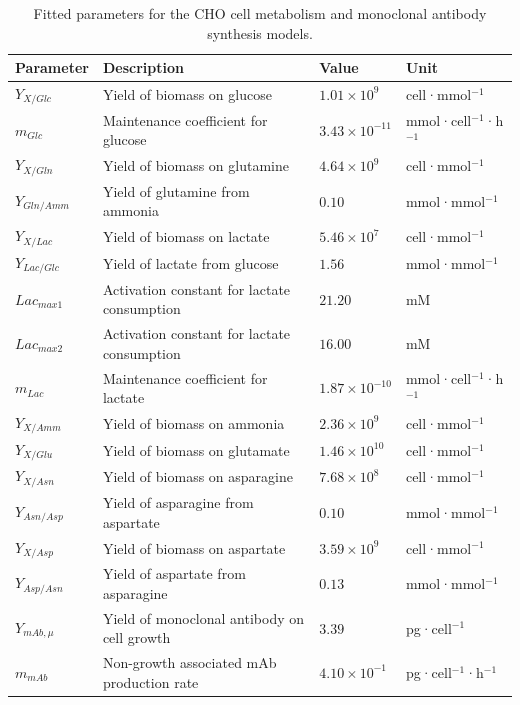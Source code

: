 \begin{table}[h!]
\centering
\caption{Fitted parameters for the CHO cell metabolism and monoclonal antibody synthesis models.}
\renewcommand{\arraystretch}{1.3}
\setlength{\tabcolsep}{8pt}
\begin{tabular}{llll}
\hline
\textbf{Parameter} & \textbf{Description} & \textbf{Value} & \textbf{Unit} \\
\hline
$Y_{X/Glc}$ & Yield of biomass on glucose & $1.01\times10^{9}$ & cell·mmol$^{-1}$ \\
$m_{Glc}$ & Maintenance coefficient for glucose & $3.43\times10^{-11}$ & mmol·cell$^{-1}$·h$^{-1}$ \\
$Y_{X/Gln}$ & Yield of biomass on glutamine & $4.64\times10^{9}$ & cell·mmol$^{-1}$ \\
$Y_{Gln/Amm}$ & Yield of glutamine from ammonia & $0.10$ & mmol·mmol$^{-1}$ \\
$Y_{X/Lac}$ & Yield of biomass on lactate & $5.46\times10^{7}$ & cell·mmol$^{-1}$ \\
$Y_{Lac/Glc}$ & Yield of lactate from glucose & $1.56$ & mmol·mmol$^{-1}$ \\
$Lac_{max1}$ & Activation constant for lactate consumption & $21.20$ & mM \\
$Lac_{max2}$ & Activation constant for lactate consumption & $16.00$ & mM \\
$m_{Lac}$ & Maintenance coefficient for lactate & $1.87\times10^{-10}$ & mmol·cell$^{-1}$·h$^{-1}$ \\
$Y_{X/Amm}$ & Yield of biomass on ammonia & $2.36\times10^{9}$ & cell·mmol$^{-1}$ \\
$Y_{X/Glu}$ & Yield of biomass on glutamate & $1.46\times10^{10}$ & cell·mmol$^{-1}$ \\
$Y_{X/Asn}$ & Yield of biomass on asparagine & $7.68\times10^{8}$ & cell·mmol$^{-1}$ \\
$Y_{Asn/Asp}$ & Yield of asparagine from aspartate & $0.10$ & mmol·mmol$^{-1}$ \\
$Y_{X/Asp}$ & Yield of biomass on aspartate & $3.59\times10^{9}$ & cell·mmol$^{-1}$ \\
$Y_{Asp/Asn}$ & Yield of aspartate from asparagine & $0.13$ & mmol·mmol$^{-1}$ \\
$Y_{mAb,\mu}$ & Yield of monoclonal antibody on cell growth & $3.39$ & pg·cell$^{-1}$ \\
$m_{mAb}$ & Non-growth associated mAb production rate & $4.10\times10^{-1}$ & pg·cell$^{-1}$·h$^{-1}$ \\
\hline
\end{tabular}
\end{table}



